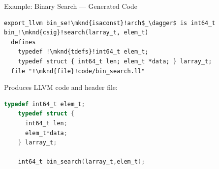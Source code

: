 \documentclass[fleqn]{beamer}
\begin{document}
\begin{frame}[fragile]{Example: Binary Search --- Generated Code}
  \newcommand{\mknd}[1]{\makebox[0pt]{\tikz[remember picture]{\node (#1) {};}}}

  \begin{lstlisting}[escapechar=!]
  export_llvm bin_se!\mknd{isaconst}!arch$_\dagger$ is int64_t bin_!\mknd{csig}!search(larray_t, elem_t)
  defines
    typedef !\mknd{tdefs}!int64_t elem_t;
    typedef struct { int64_t len; elem_t *data; } larray_t;
  file "!\mknd{file}!code/bin_search.ll"
  \end{lstlisting}




  Produces LLVM code and header file:
  \begin{lstlisting}[language=C]
    typedef int64_t elem_t;
    typedef struct {
      int64_t len;
      elem_t*data;
    } larray_t;

    int64_t bin_search(larray_t,elem_t);
  \end{lstlisting}


\end{frame}
\end{document}
